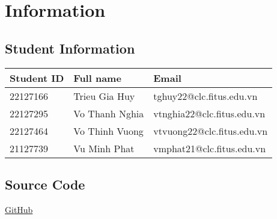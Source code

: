\section{Information}
\subsection{Student Information}
\renewcommand{\arraystretch}{2}

\begin{center}
\begin{tabular}{|>{\centering\arraybackslash}m{4cm}|>{\centering\arraybackslash}m{5cm}|>{\centering\arraybackslash}m{7cm}|}
  \hline
  \textbf{\Large Student ID} & \textbf{\Large Full name} & \textbf{\Large Email} \\
  \hline
  \Large 22127166 & \Large Trieu Gia Huy & \Large tghuy22@clc.fitus.edu.vn
  \\
  \hline
  \Large 22127295 & \Large Vo Thanh Nghia & \Large vtnghia22@clc.fitus.edu.vn \\
  \hline
  \Large 22127464 & \Large Vo Thinh Vuong & \Large vtvuong22@clc.fitus.edu.vn \\
  \hline  
  \Large 21127739 & \Large Vu Minh Phat & \Large vmphat21@clc.fitus.edu.vn \\
  \hline    
\end{tabular}
\end{center}

\subsection{Source Code}

\href{https://github.com/nghessss/CSC15004-StatisticalML}{GitHub}

